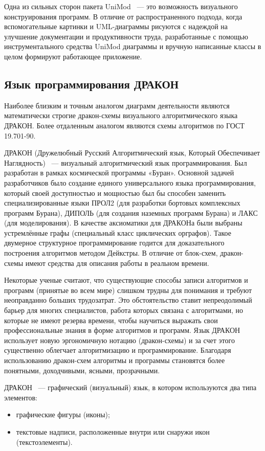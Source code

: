 Одна из сильных сторон пакета UniMod ~--- это возможность визуального конструирования программ. В отличие от распространенного подхода, когда вспомогательные картинки и UML-диаграммы рисуются с надеждой на улучшение документации и продуктивности труда, разработанные с помощью инструментального средства UniMod диаграммы и вручную написанные классы в целом формируют работающее приложение.

\subsection{Язык программирования ДРАКОН}

Наиболее близким и точным аналогом диаграмм деятельности являются математически строгие дракон-схемы визуального алгоритмического языка ДРАКОН. Более отдаленным аналогом являются схемы алгоритмов по ГОСТ 19.701-90.

ДРАКОН (Дружелюбный Русский Алгоритмический язык, Который Обеспечивает Наглядность) ~--- визуальный алгоритмический язык программирования. Был разработан в рамках космической программы «Буран». Основной задачей разработчиков было создание единого универсального языка программирования, который своей доступностью и мощностью был бы способен заменить специализированные языки ПРОЛ2 (для разработки бортовых комплексных программ Бурана), ДИПОЛЬ (для создания наземных программ Бурана) и ЛАКС (для моделирования). В качестве аксиоматики для ДРАКОНа были выбраны устремлённые графы (специальный класс циклических орграфов). Такое двумерное структурное программирование годится для доказательного построения алгоритмов методом Дейкстры. В отличие от блок-схем, дракон-схемы имеют средства для описания работы в реальном времени.

Некоторые ученые считают, что существующие способы записи алгоритмов и программ (принятые во всем мире) слишком трудны для понимания и требуют неоправданно больших трудозатрат. Это обстоятельство ставит непреодолимый барьер для многих специалистов, работа которых связана с алгоритмами, но которые не имеют резерва времени, чтобы научиться выражать свои профессиональные знания в форме алгоритмов и программ. Язык ДРАКОН использует новую эргономичную нотацию (дракон-схемы) и за счет этого существенно облегчает алгоритмизацию и программирование. Благодаря использованию дракон-схем алгоритмы и программы становятся более понятными, доходчивыми, ясными, прозрачными.

ДРАКОН ~--- графический (визуальный) язык, в котором используются два типа элементов:
\begin{itemize}
\item графические фигуры (иконы);
\item текстовые надписи, расположенные внутри или снаружи икон (текстоэлементы).
\end{itemize}

